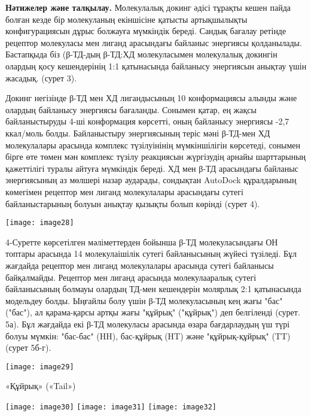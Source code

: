 \begin{multicols}{2}
{\bfseries Нәтижелер және талқылау.} Молекулалық докинг әдісі тұрақты кешен
пайда болған кезде бір молекуланың екіншісіне қатысты артықшылықты
конфигурациясын дұрыс болжауға мүмкіндік береді. Сандық бағалау ретінде
рецептор молекуласы мен лиганд арасындағы байланыс энергиясы
қолданылады. Бастапқыда біз (β-ТД-дың β-ТД:ХД молекуласымен молекулалық
докингін олардың қосу кешендерінің 1:1 қатынасында байланысу энергиясын
анықтау үшін жасадық. (сурет 3).

Докинг негізінде β-ТД мен ХД лигандысының 10 конформациясы алынды және
олардың байланысу энергиясы бағаланды. Сонымен қатар, ең жақсы
байланыстыруды 4-ші конформация көрсетті, оның байланысу энергиясы -2,7
ккал/моль болды. Байланыстыру энергиясының теріс мәні β-ТД-мен ХД
молекулалары арасында комплекс түзілуінінің мүмкіншілігін көрсетеді,
сонымен бірге өте төмен мән комплекс түзілу реакциясын жүргізудің арнайы
шарттарының қажеттілігі туралы айтуға мүмкіндік береді. ХД мен β-ТД
арасындағы байланыс энергиясының аз мөлшері назар аударады, сондықтан
AutoDock құралдарының көмегімен рецептор мен лиганд молекулалары
арасындағы сутегі байланыстарының болуын анықтау қызықты болып көрінді
(сурет 4).


{\centering
\texttt{[image: image28]}
}

4-Суретте көрсетілген мәліметтерден бойынша β-ТД молекуласындағы ОН
топтары арасында 14 молекулаішілік сутегі байланысының жүйесі түзіледі.
Бұл жағдайда рецептор мен лиганд молекулалары арасында сутегі байланысы
байқалмайды. Рецептор мен лиганд арасында молекулааралық сутегі
байланысының болмауы олардың ТД-мен кешендерін молярлық 2:1 қатынасында
модельдеу болды. Ыңғайлы болу үшін β-ТД молекуласының кең жағы "бас"
("бас"), ал қарама-қарсы артқы жағы "құйрық" ("құйрық") деп белгіленді
(сурет. 5а). Бұл жағдайда екі β-ТД молекуласы арасында өзара
бағдарлаудың үш түрі болуы мүмкін: "бас-бас" (HH), бас-құйрық (HT) және
"құйрық-құйрық" (TT) (сурет 5б-г).

\newpage

{\centering
{}
\texttt{[image: image29]}
\caption*{«Құйрық» («Tail»)}
}
{\centering
\texttt{[image: image30]}
}
{\centering
\texttt{[image: image31]}
}
{\centering
\texttt{[image: image32]}
}


\end{multicols}
